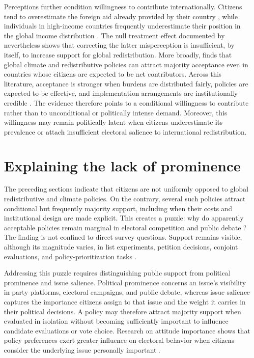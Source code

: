 \documentclass[11pt,a4paper]{article}
\begin{document}
Perceptions further condition willingness to contribute internationally. Citizens tend to overestimate the foreign aid already provided by their country \citep{kaufmann_foreign_2019}, while individuals in high-income countries frequently underestimate their position in the global income distribution \citep{nair_misperceptions_2018,fehr_your_2019}. The null treatment effect documented by \citet{fehr_your_2019} nevertheless shows that correcting the latter misperception is insufficient, by itself, to increase support for global redistribution. More broadly, \citet{fabre_public_2026} finds that global climate and redistributive policies can attract majority acceptance even in countries whose citizens are expected to be net contributors. Across this literature, acceptance is stronger when burdens are distributed fairly, policies are expected to be effective, and implementation arrangements are institutionally credible \citep{fabre_public_2026,bechtel_mass_2013,gampfer_obtaining_2014}. The evidence therefore points to a conditional willingness to contribute rather than to unconditional or politically intense demand. Moreover, this willingness may remain politically latent when citizens underestimate its prevalence or attach insufficient electoral salience to international redistribution.

\section{Explaining the lack of prominence}

The preceding sections indicate that citizens are not uniformly opposed to global redistributive and climate policies. %
On the contrary, several such policies attract conditional but frequently majority support, including when their costs and institutional design are made explicit. This creates a %
puzzle: why do apparently acceptable policies remain marginal in electoral competition and public debate \citep{fabre_majority_2025,fabre_public_2026}? The finding is not confined to direct survey questions. Support remains visible, although its magnitude varies, in list experiments, petition decisions, conjoint evaluations, and policy-prioritization tasks \citep{fabre_majority_2025}.

Addressing this puzzle requires distinguishing public support from political prominence and issue salience. Political prominence concerns an issue's visibility in party platforms, electoral campaigns, and public debate, whereas issue salience captures the importance citizens assign to that issue and the weight it carries in their political decisions. A policy may therefore attract majority support when evaluated in isolation without becoming sufficiently important to influence candidate evaluations or vote choice. Research on attitude importance shows that policy preferences exert greater influence on electoral behavior when citizens consider the underlying issue personally important \citep{krosnick_role_1988,dennison_review_2019}.
\end{document}
